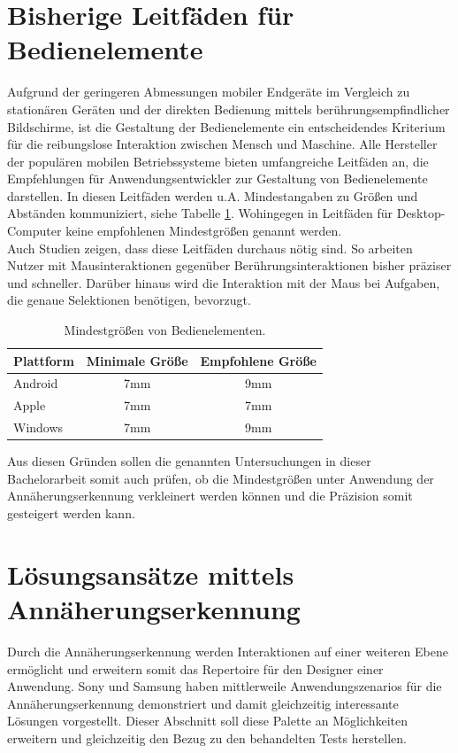 \documentclass[a4paper,12pt,bibliography=totoc]{scrreprt}%
\begin{document}
\section{Bisherige Leitfäden für Bedienelemente}
Aufgrund der geringeren Abmessungen mobiler Endgeräte im Vergleich zu stationären Geräten und der direkten Bedienung mittels berührungsempfindlicher Bildschirme, ist die Gestaltung der Bedienelemente ein entscheidendes Kriterium für die reibungslose Interaktion zwischen Mensch und Maschine. Alle Hersteller der populären mobilen Betriebssysteme bieten umfangreiche Leitfäden an, die Empfehlungen für Anwendungsentwickler zur Gestaltung von Bedienelemente darstellen. In diesen Leitfäden werden u.A. Mindestangaben zu Größen und Abständen kommuniziert, siehe Tabelle \ref{leitfadenalle}. Wohingegen in Leitfäden für Desktop-Computer keine empfohlenen Mindestgrößen genannt werden.\\
Auch Studien zeigen, dass diese Leitfäden durchaus nötig sind. So arbeiten Nutzer mit Mausinteraktionen gegenüber Berührungsinteraktionen bisher präziser und schneller. Darüber hinaus wird die Interaktion mit der Maus bei Aufgaben, die genaue Selektionen benötigen, bevorzugt.\citep{touchmouse}
\begin{table}
\centering
\renewcommand{\arraystretch}{2}
\setlength{\tabcolsep}{15pt}
\begin{tabular}{ l c c }
Plattform & Minimale Größe & Empfohlene Größe\\\hline
Android \cite{androidrichtlinien} & 7mm & 9mm\\
Apple \cite{applerichtlinien} & 7mm & 7mm\\
Windows \cite{winrichtlinien} & 7mm & 9mm\\
\end{tabular}
\caption{Mindestgrößen von Bedienelementen.}
\label{leitfadenalle}
\end{table}
Aus diesen Gründen sollen die genannten Untersuchungen in dieser Bachelorarbeit somit auch prüfen, ob die Mindestgrößen unter Anwendung der Annäherungserkennung verkleinert werden können und die Präzision somit gesteigert werden kann.

\section{Lösungsansätze mittels Annäherungserkennung}
Durch die Annäherungserkennung werden Interaktionen auf einer weiteren Ebene ermöglicht und erweitern somit das Repertoire für den Designer einer Anwendung. Sony und Samsung haben mittlerweile Anwendungszenarios für die Annäherungserkennung demonstriert und damit gleichzeitig interessante Lösungen vorgestellt. Dieser Abschnitt soll diese Palette an Möglichkeiten erweitern und gleichzeitig den Bezug zu den behandelten Tests herstellen.
\end{document}
